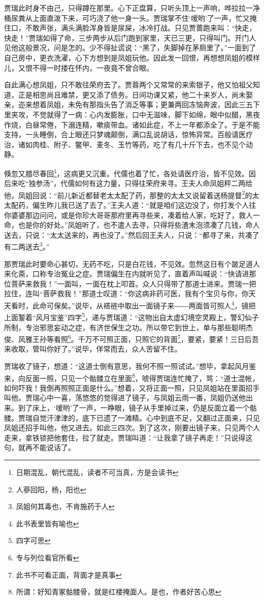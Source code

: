 \documentclass[12pt,oneside]{book}
\begin{document}
贾瑞此时身不由己，只得蹲在那里。心下正盘算，只听头顶上一声响，哗拉拉一净桶尿粪从上面直泼下来，可巧浇了他一身一头。贾瑞掌不住‘嗳哟’了一声，忙又掩住口，不敢声张，满头满脸浑身皆是尿屎，冰冷打战。只见贾蔷跑来叫：“快走，快走！”贾瑞如得了命，三步两步从后门跑到家里，天已三更，只得叫门。开门人见他这般景况，问是怎的。少不得扯谎说：“黑了，失脚掉在茅厕里了。”一面到了自己房中，更衣洗濯，心下方想到是凤姐玩他。因此发一回恨，再想想凤姐的模样儿，又恨不得一时搂在怀内，一夜竟不曾合眼。

自此满心想凤姐，只不敢往荣府去了。贾蓉两个又常常的来索银子，他又怕祖父知道，正是相思尚且难禁，更又添了债务。日间功课又紧，他二十来岁人，尚未娶亲，迩来想着凤姐，未免有那指头告了消乏等事；更兼两回冻恼奔波，因此三五下里夹攻，不觉就得了一病：心内发膨胀，口中无滋味，脚下如绵，眼中似醋，黑夜作烧，白昼常倦，下溺连精，嗽痰带血。诸如此症，不上一年都添全了。于是不能支持，一头睡倒，合上眼还只梦魂颠倒，满口乱说胡话，惊怖异常。百般请医疗治，诸如肉桂、附子、鳖甲、麦冬、玉竹等药，吃了有几十斤下去，也不见个动静。

倏忽又腊尽春回\footnote{日期混乱，朝代混乱，读者不可当真，方是会读书}，这病更又沉重。代儒也着了忙，各处请医疗治，皆不见效。因后来吃“独参汤”，代儒如何有这力量，只得往荣府来寻。王夫人命凤姐秤二两给他，凤姐回说：“前儿新近都替老太太配了药，那整的太太又说留着送杨提督\footnote{人蔘回阳，杨，阳也}的太太配药，偏生昨儿我已送了去了。”王夫人道：“就是咱们这边没了，你打发个人往你婆婆那边问问，或是你珍大哥哥那府里再寻些来，凑着给人家，吃好了，救人一命，也是你的好处。”凤姐听了，也不遣人去寻，只得将些渣末泡须凑了几钱，命人送去，只说：“太太送来的，再也没了。”然后回王夫人，只说：“都寻了来，共凑了有二两送去\footnote{凤姐何其毒也，不肯施药于人}。”

那贾瑞此时要命心甚切，无药不吃，只是白花钱，不见效。忽然这日有个跛足道人来化斋，口称专治冤业之症。贾瑞偏生在内就听见了，直着声叫喊说：“快请进那位菩萨来救我！”一面叫，一面在枕上叩首。众人只得带了那道士进来。贾瑞一把拉住，连叫“菩萨救我！”那道士叹道：“你这病非药可医，我有个宝贝与你，你天天看时，此命可保矣。”说毕，从褡裢中取出一面镜子来――两面皆可照人\footnote{此书表里皆有喻也}，镜把上面錾着“风月宝鉴”四字\footnote{四字可思}，递与贾瑞道：“这物出自太虚幻境空灵殿上，警幻仙子所制，专治邪思妄动之症，有济世保生之功。所以带它到世上，单与那些聪明杰俊、风雅王孙等看照\footnote{专与列位看官所看}。千万不可照正面，只照它的背面\footnote{此书不可看正面，背面才是真事}，要紧，要紧！三日后吾来收取，管叫你好了。”说毕，佯常而去，众人苦留不住。

贾瑞收了镜子，想道：“这道士倒有意思，我何不照一照试试。”想毕，拿起风月鉴来，向反面一照，只见一个骷髅立在里面\footnote{所谓：好知青冢骷髅骨，就是红楼掩面人。是也，作者好苦心思}，唬得贾瑞连忙掩了，骂：“道士混帐，如何吓我！我倒再照照正面是什么。”想着，又将正面一照，只见凤姐站在里面招手叫他。贾瑞心中一喜，荡悠悠的觉得进了镜子，与凤姐云雨一番，凤姐仍送他出来。到了床上，‘嗳哟’了一声，一睁眼，镜子从手里掉过来，仍是反面立着一个骷髅。贾瑞自觉汗津津的，底下已遗了一滩精。心中到底不足，又翻过正面来，只见凤姐还招手叫他，他又进去。如此三四次。到了这次，刚要出镜子来，只见两个人走来，拿铁锁把他套住，拉了就走。贾瑞叫道：“让我拿了镜子再走！”只说得这句，就再不能说话了。
\end{document}
